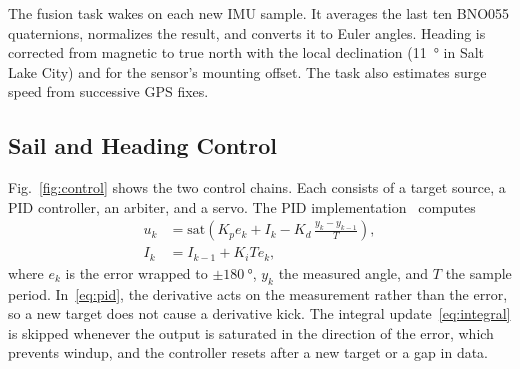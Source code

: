 The fusion task wakes on each new IMU sample. It averages the last ten BNO055
quaternions, normalizes the result, and converts it to Euler angles. Heading is
corrected from magnetic to true north with the local declination
(\SI{11}{\degree} in Salt Lake City) and for the sensor's mounting offset. The
task also estimates surge speed from successive GPS fixes.

\subsection{Sail and Heading Control}
Fig.~\ref{fig:control} shows the two control chains. Each consists of a
target source, a PID controller, an arbiter, and a servo. The PID
implementation~\cite{astrom1995} computes
\begin{align}
u_k &= \mathrm{sat}\!\left(K_p e_k + I_k - K_d\,\frac{y_k - y_{k-1}}{T}\right), \label{eq:pid}\\
I_k &= I_{k-1} + K_i T e_k , \label{eq:integral}
\end{align}
where $e_k$ is the error wrapped to $\pm\SI{180}{\degree}$, $y_k$ the measured
angle, and $T$ the sample period. In~\eqref{eq:pid}, the derivative acts on the measurement
rather than the error, so a new target does not cause a derivative kick. The
integral update~\eqref{eq:integral} is skipped whenever the output is
saturated in the direction of the error, which prevents windup, and the controller resets after a new target or a
gap in data.

